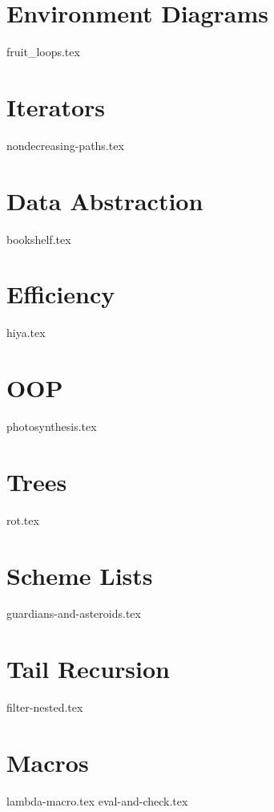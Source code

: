 \documentclass{exam}
\begin{document}
\begin{questions}
\section{Environment Diagrams}
{fruit_loops.tex}

\newpage
\section{Iterators}
{nondecreasing-paths.tex}

\section{Data Abstraction}
{bookshelf.tex}

\section{Efficiency}
{hiya.tex}

\section{OOP}
{photosynthesis.tex}

\section{Trees}
{rot.tex}

\section{Scheme Lists}
{guardians-and-asteroids.tex}

\section{Tail Recursion}
{filter-nested.tex}

\section{Macros}
{lambda-macro.tex}
{eval-and-check.tex}
\end{questions}
\end{document}
